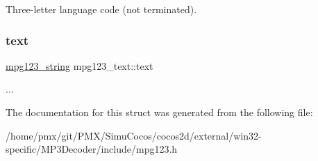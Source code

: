 Three-\/letter language code (not terminated). \mbox{\label{structmpg123__text_a574b9464a996281f629858c0216eae18}} 
\subsubsection{\texorpdfstring{text}{text}}
{\footnotesize\ttfamily \hyperlink{structmpg123__string}{mpg123\+\_\+string} mpg123\+\_\+text\+::text}

... 

The documentation for this struct was generated from the following file\+:\begin{DoxyCompactItemize}
\item 
/home/pmx/git/\+P\+M\+X/\+Simu\+Cocos/cocos2d/external/win32-\/specific/\+M\+P3\+Decoder/include/mpg123.\+h\end{DoxyCompactItemize}
